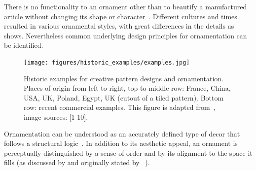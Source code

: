 There is no functionality to an ornament other than to beautify a manufactured article without changing its shape or character~\cite{ward_1896_tpo}.
Different cultures and times resulted in various ornamental styles, with great differences in the details as  shows. Nevertheless common underlying design principles for ornamentation can be identified.

\begin{figure}
       \texttt{[image: figures/historic\_examples/examples.jpg]}
        \caption[Historic pattern examples]{\label{fig:historic_examples} Historic examples for creative pattern designs and ornamentation. Places of origin from left to right, top to middle row:  France, China, USA, UK, Poland, Egypt, UK (cutout of a tiled pattern). Bottom row: recent commercial examples. This figure is adapted from~\cite{gieseke_2017_ooo}, image sources: [1-10].}
\end{figure}

Ornamentation can be understood as an accurately defined type of decor that follows a structural logic~\cite{ward_1896_tpo, moughtin_1999_udo, arbruzzo_2006_dec}. 
In addition to its aesthetic appeal, an ornament is perceptually distinguished by a sense of order and by its alignment to the space it fills (as discussed by \cite{wong_1998_cgf,gieseke_2017_ooo} and originally stated by \citeauthor*{ward_1896_tpo}~\cite{ward_1896_tpo, dresser_1875_pdd, arbruzzo_2006_dec}). 




